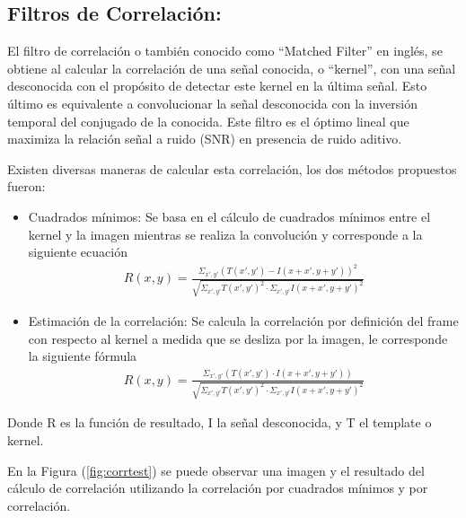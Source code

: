 \subsection{Filtros de Correlación:}
\label{sec:corr}
El filtro de correlación o también conocido como ``Matched Filter'' \cite{ref:Corr} en inglés, se obtiene al calcular la correlación de una señal conocida, o ``kernel'', con una señal desconocida con el propósito de detectar este kernel en la última señal. Esto último es equivalente a convolucionar la señal desconocida con la inversión temporal del conjugado de la conocida. Este filtro es el óptimo lineal que maximiza la relación señal a ruido (SNR) en presencia de ruido aditivo.

Existen diversas maneras de calcular esta correlación, los dos métodos propuestos fueron:
\begin{itemize}
\item Cuadrados mínimos:
Se basa en el cálculo de cuadrados mínimos entre el kernel y la imagen mientras se realiza la convolución y corresponde a la siguiente ecuación
\begin{align}
R(x,y) = \frac{\Sigma_{x',y'} \left( T(x',y') - I(x+x',y+y') \right)^2}{\sqrt{\Sigma_{x',y'} T(x',y')^2  \cdot \Sigma_{x',y'}  I(x+x',y+y')^2}}
\end{align}
\item Estimación de la correlación:
Se calcula la correlación por definición del frame con respecto al kernel a medida que se desliza por la imagen, le corresponde la siguiente fórmula
\begin{align}
R(x,y) = \frac{\Sigma_{x',y'} \left( T(x',y') \cdot I(x+x',y+y') \right)}{\sqrt{\Sigma_{x',y'} T(x',y')^2  \cdot \Sigma_{x',y'}  I(x+x',y+y')^2}}
\end{align}
\end{itemize}
Donde R es la función de resultado, I la señal desconocida, y T el template o kernel.

En la Figura (\ref{fig:corrtest}) se puede observar una imagen y el resultado del cálculo de correlación utilizando la correlación por cuadrados mínimos y por correlación.

